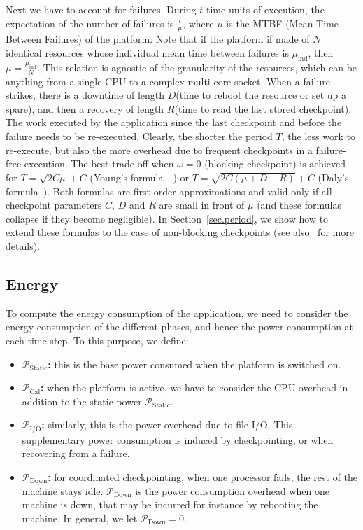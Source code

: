 \documentclass[a4paper]{article}
\newcommand{\ema}[1]{\ensuremath{#1}\xspace}
\newcommand{\mtbf}{\ema{\mu}}
\newcommand{\nodes}{\ema{N}}
\newcommand{\mtbfind}{\ema{\mu_{\text{ind}}}}
\newcommand{\ccc}{\ema{C}}
\newcommand{\rrr}{\ema{R}}
\newcommand{\ddd}{\ema{D}}
\newcommand{\period}{T}
\newcommand{\power}[1][]{\ema{\mathcal{P}_{\text{#1}}}}
\newcommand{\pCal}{\power[Cal]}
\newcommand{\pIO}{\power[I/O]}
\newcommand{\pDown}{\power[Down]}
\newcommand{\pIdle}{\power[Static]}
\newcommand{\workduringckpt}{\omega}
\begin{document}
Next we have to account for failures. During $t$ time units of
execution, the expectation of the number of failures is
$\frac{t}{\mtbf}$, where \mtbf is the MTBF (Mean Time Between Failures) of
the platform.  Note that if the platform if made of $\nodes$ identical
resources whose individual mean time between failures is \mtbfind,
then $\mtbf = \frac{\mtbfind}{\nodes}$. This relation is agnostic of
the granularity of the resources, which can be anything from a single
CPU to a complex multi-core socket. When a failure strikes,
there is a downtime of length \ddd (time to reboot the resource or set
up a spare), and then a recovery of length \rrr (time to read the last stored checkpoint).
The work executed by the application since the last checkpoint and before the failure needs 
to be re-executed. Clearly, the shorter the period $\period$, the less work to re-execute, but also
the more overhead due to frequent checkpoints in a failure-free execution. The best trade-off 
when $\workduringckpt = 0$ (blocking checkpoint) is achieved for $\period = \sqrt{2 \ccc \mu} + \ccc$
(Young's formula~~\cite{young74}) or $\period = \sqrt{2 \ccc (\mu +\ddd+ \rrr)} + \ccc$ 
(Daly's formula~\cite{daly04}).
Both formulas are first-order approximations and valid only if all checkpoint parameters \ccc, \ddd and \rrr
are small in front of $\mu$ (and these formulas collapse if they become negligible).
In Section~\ref{sec.period}, we show how to extend these formulas to the case of non-blocking checkpoints (see
also~\cite{ccpe-2012-ckpt} for more details).

\subsection{Energy}
\label{sec.model.energy}

To compute the energy consumption of the application, we need to consider the energy 
consumption of the different phases, and hence the power consumption at each time-step. 
To this purpose,  we define:
\begin{itemize}
	\item {\bf \pIdle:} this is the base power consumed when the platform is switched on.
	\item {\bf \pCal:} when the platform is active, we have to consider the CPU overhead in addition to the static power \pIdle.  
	\item {\bf \pIO:} similarly, this is the power overhead due to file I/O. This supplementary power   
consumption is induced by checkpointing, or when recovering from a failure.
	\item {\bf \pDown:} for coordinated checkpointing, when one processor fails, the rest of the
machine stays idle. \pDown is the power consumption overhead when one machine is down, that may be incurred for instance by rebooting the machine. In general, we let $\pDown=0$.
\end{itemize}
\end{document}

